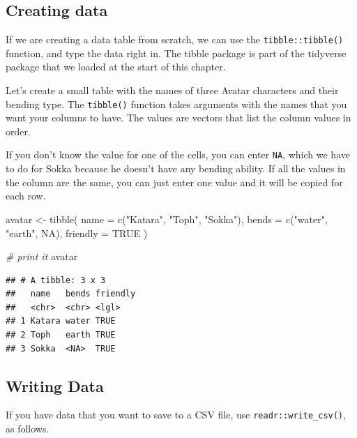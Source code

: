 \documentclass[
  oneside]{book}
\newenvironment{Shaded}{\begin{snugshade}}{\end{snugshade}}
\newcommand{\AttributeTok}[1]{\textcolor[rgb]{0.77,0.63,0.00}{#1}}
\newcommand{\CommentTok}[1]{\textcolor[rgb]{0.56,0.35,0.01}{\textit{#1}}}
\newcommand{\ConstantTok}[1]{\textcolor[rgb]{0.00,0.00,0.00}{#1}}
\newcommand{\FunctionTok}[1]{\textcolor[rgb]{0.00,0.00,0.00}{#1}}
\newcommand{\NormalTok}[1]{#1}
\newcommand{\OtherTok}[1]{\textcolor[rgb]{0.56,0.35,0.01}{#1}}
\newcommand{\StringTok}[1]{\textcolor[rgb]{0.31,0.60,0.02}{#1}}
\begin{document}
\hypertarget{creating-data}{%
\subsection{Creating data}\label{creating-data}}

If we are creating a data table from scratch, we can use the \texttt{tibble::tibble()} function, and type the data right in. The tibble package is part of the tidyverse package that we loaded at the start of this chapter.

Let's create a small table with the names of three Avatar characters and their bending type. The \texttt{tibble()} function takes arguments with the names that you want your columns to have. The values are vectors that list the column values in order.

If you don't know the value for one of the cells, you can enter \texttt{NA}, which we have to do for Sokka because he doesn't have any bending ability. If all the values in the column are the same, you can just enter one value and it will be copied for each row.

\begin{Shaded}
\begin{Highlighting}[]
\NormalTok{avatar }\OtherTok{\textless{}{-}} \FunctionTok{tibble}\NormalTok{(}
  \AttributeTok{name =} \FunctionTok{c}\NormalTok{(}\StringTok{"Katara"}\NormalTok{, }\StringTok{"Toph"}\NormalTok{, }\StringTok{"Sokka"}\NormalTok{),}
  \AttributeTok{bends =} \FunctionTok{c}\NormalTok{(}\StringTok{"water"}\NormalTok{, }\StringTok{"earth"}\NormalTok{, }\ConstantTok{NA}\NormalTok{),}
  \AttributeTok{friendly =} \ConstantTok{TRUE}
\NormalTok{)}

\CommentTok{\# print it}
\NormalTok{avatar}
\end{Highlighting}
\end{Shaded}

\begin{verbatim}
## # A tibble: 3 x 3
##   name   bends friendly
##   <chr>  <chr> <lgl>   
## 1 Katara water TRUE    
## 2 Toph   earth TRUE    
## 3 Sokka  <NA>  TRUE
\end{verbatim}

\hypertarget{writing-data}{%
\subsection{Writing Data}\label{writing-data}}

If you have data that you want to save to a CSV file, use \texttt{readr::write\_csv()}, as follows.
\end{document}
